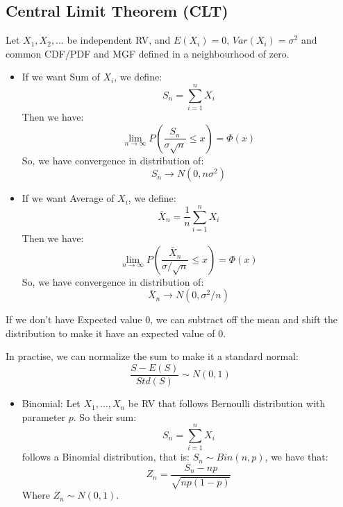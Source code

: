 \documentclass[12pt]{article}
\begin{document}
\begin{multicols*}{4}
    \section{Central Limit Theorem (CLT)}
    Let $X_1, X_2, \dots$ be independent RV, and $E(X_i)=0$, $Var(X_i)=\sigma^2$ and common CDF/PDF and MGF defined in a neighbourhood of zero.
    \begin{itemize}[leftmargin=*]
        \item If we want Sum of $X_i$, we define:
              $$S_n=\sum_{i=1}^nX_i$$
              Then we have:
              $$\lim_{n\to\infty}P\left(\frac{S_n}{\sigma\sqrt{n}}\leq x\right)=\Phi(x)$$
              So, we have convergence in distribution of:
              $$S_n\to N(0, n\sigma^2)$$
        \item If we want Average of $X_i$, we define:
              $$\bar X_n=\frac{1}{n}\sum_{i=1}^nX_i$$
              Then we have:
              $$\lim_{n\to\infty}P\left(\frac{\bar X_n}{\sigma/\sqrt{n}}\leq x\right)=\Phi(x)$$
              So, we have convergence in distribution of:
              $$\bar X_n\to N(0, \sigma^2/n)$$
    \end{itemize}
    If we don't have Expected value $0$, we can subtract off the mean and shift the distribution to make it have an expected value of $0$.
    \begin{tcolorbox}[title=Normal Approximation]
        In practise, we can normalize the sum to make it a standard normal:
        $$\frac{S-E(S)}{Std(S)}\sim N(0, 1)$$
        \begin{itemize}[leftmargin=*]
            \item Binomial:
                  Let $X_1, \dots, X_n$ be RV that follows Bernoulli distribution with parameter $p$. So their sum:
                  $$S_n=\sum_{i=1}^nX_i$$
                  follows a Binomial distribution, that is: $S_n\sim Bin(n, p)$, we have that:
                  $$Z_n=\frac{S_n-np}{\sqrt{np(1-p)}}$$
                  Where $Z_n\sim N(0, 1)$.
        \end{itemize}
    \end{tcolorbox}
\end{multicols*}
\end{document}
